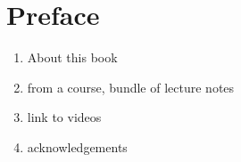 
\chapter*{Preface}

\begin{enumerate}
  \item About this book
  \item from a course, bundle of lecture notes
  \item link to videos
  \item acknowledgements
\end{enumerate}